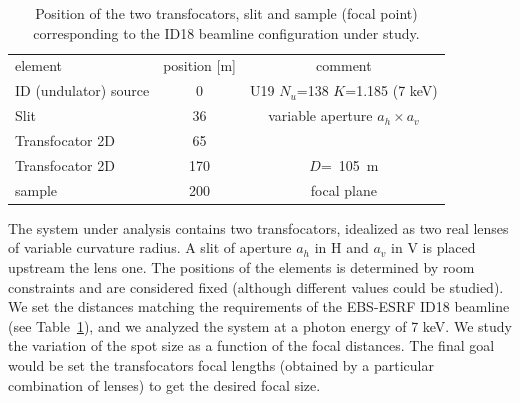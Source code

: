 \documentclass{iucr}              %
\begin{document}
\begin{table}[]
    \label{table:id18parameters}
    \caption{Position of the two transfocators, slit and sample (focal point) corresponding to the ID18 beamline configuration under study. }
    \centering
    \begin{tabular}{l|c|c}
         element & position [m] & comment\\
         ID (undulator) source& 0 & U19 $N_u$=138 $K$=1.185 (7 keV)\\
         Slit & 36 &
         variable aperture $a_h\times a_v$
         \\
         Transfocator 2D & 65 & 
         \\
         Transfocator 2D & 170 & $D$=~\SI{105}{\meter} \\
         sample & 200 & focal plane
    \end{tabular}


\end{table}

The system under analysis contains two transfocators, idealized as two real lenses of variable curvature radius. A slit of aperture $a_h$ in H and $a_v$ in V is placed upstream the lens one. The positions of the elements is determined by room constraints and are considered fixed (although different values could be studied). We set the distances matching the requirements of the EBS-ESRF ID18 beamline (see Table~\ref{table:id18parameters}), and we analyzed the system at a photon energy of 7 keV. We study the variation of the spot size as a function of the focal distances. The final goal would be set the transfocators focal lengths (obtained by a particular combination of lenses) to get the desired focal size. 


\end{document}
